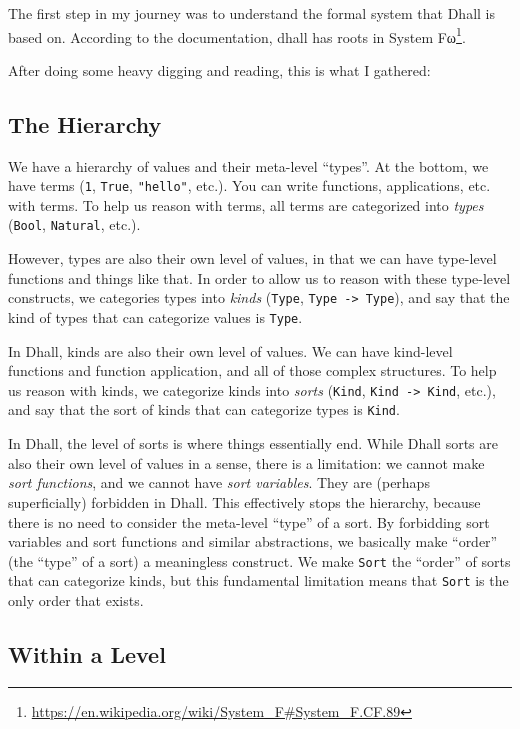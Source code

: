 \documentclass[]{article}
\renewcommand{\href}[2]{#2\footnote{\url{#1}}}
\begin{document}
The first step in my journey was to understand the formal system that Dhall is
based on. According to the documentation, dhall has roots in
\href{https://en.wikipedia.org/wiki/System_F\#System_F.CF.89}{System Fω}.

After doing some heavy digging and reading, this is what I gathered:

\hypertarget{the-hierarchy}{%
\subsection{The Hierarchy}\label{the-hierarchy}}

We have a hierarchy of values and their meta-level ``types''. At the bottom, we
have terms (\texttt{1}, \texttt{True}, \texttt{"hello"}, etc.). You can write
functions, applications, etc. with terms. To help us reason with terms, all
terms are categorized into \emph{types} (\texttt{Bool}, \texttt{Natural}, etc.).

However, types are also their own level of values, in that we can have
type-level functions and things like that. In order to allow us to reason with
these type-level constructs, we categories types into \emph{kinds}
(\texttt{Type}, \texttt{Type\ -\textgreater{}\ Type}), and say that the kind of
types that can categorize values is \texttt{Type}.

In Dhall, kinds are also their own level of values. We can have kind-level
functions and function application, and all of those complex structures. To help
us reason with kinds, we categorize kinds into \emph{sorts} (\texttt{Kind},
\texttt{Kind\ -\textgreater{}\ Kind}, etc.), and say that the sort of kinds that
can categorize types is \texttt{Kind}.

In Dhall, the level of sorts is where things essentially end. While Dhall sorts
are also their own level of values in a sense, there is a limitation: we cannot
make \emph{sort functions}, and we cannot have \emph{sort variables}. They are
(perhaps superficially) forbidden in Dhall. This effectively stops the
hierarchy, because there is no need to consider the meta-level ``type'' of a
sort. By forbidding sort variables and sort functions and similar abstractions,
we basically make ``order'' (the ``type'' of a sort) a meaningless construct. We
make \texttt{Sort} the ``order'' of sorts that can categorize kinds, but this
fundamental limitation means that \texttt{Sort} is the only order that exists.

\hypertarget{within-a-level}{%
\subsection{Within a Level}\label{within-a-level}}
\end{document}
